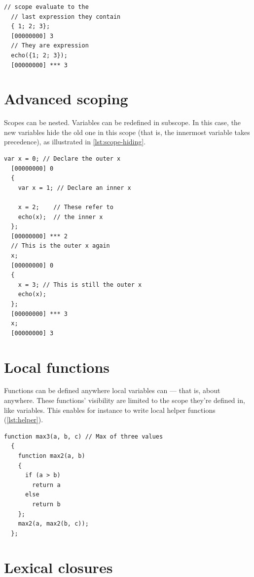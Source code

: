 \documentclass[openright,twoside,12pt]{report}
\newcommand{\lst}[1]{\autoref{lst:#1}}
\begin{document}
\begin{lstlisting}[caption=Using scope as expressions,label=lst:scope-exp]
  // scope evaluate to the
  // last expression they contain
  { 1; 2; 3};
  [00000000] 3
  // They are expression
  echo({1; 2; 3});
  [00000000] *** 3
\end{lstlisting}

\section{Advanced scoping}

Scopes can be nested. Variables can be redefined in subscope. In this
case, the new variables hide the old one in this scope (that is, the
innermost variable takes precedence), as illustrated in
\lst{scope-hiding}.

\begin{lstlisting}[caption=Redefining variables in
  subscopes,label=lst:scope-hiding]
  var x = 0; // Declare the outer x
  [00000000] 0
  {
    var x = 1; // Declare an inner x

    x = 2;    // These refer to
    echo(x);  // the inner x
  };
  [00000000] *** 2
  // This is the outer x again
  x;
  [00000000] 0
  {
    x = 3; // This is still the outer x
    echo(x);
  };
  [00000000] *** 3
  x;
  [00000000] 3

\end{lstlisting}

\section{Local functions}

Functions can be defined anywhere local variables can --- that is,
about anywhere. These functions' visibility are limited to the scope
they're defined in, like variables. This enables for instance to write
local helper functions (\lst{helper}).

\begin{lstlisting}[caption=Local helper function, label=lst:helper]
  function max3(a, b, c) // Max of three values
  {
    function max2(a, b)
    {
      if (a > b)
        return a
      else
        return b
    };
    max2(a, max2(b, c));
  };
\end{lstlisting}

\section{Lexical closures}
\end{document}
